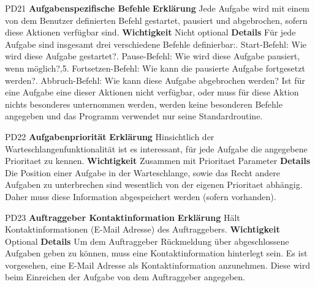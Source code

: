 \documentclass[a4paper,12pt]{article}
\begin{document}
\begin{itemize}[nosep]
\begin{minipage}[t]{\linewidth}
\item[PD21] \textbf{Aufgabenspezifische Befehle}
\subitem \textbf{Erklärung} Jede Aufgabe wird mit einem von dem Benutzer definierten Befehl gestartet, pausiert und abgebrochen, sofern diese Aktionen verfügbar sind.
\subitem \textbf{Wichtigkeit} Nicht optional
\subitem \textbf{Details} Für jede Aufgabe sind insgesamt drei verschiedene Befehle definierbar:. Start-Befehl: Wie wird diese Aufgabe gestartet?. Pause-Befehl: Wie wird diese Aufgabe pausiert, wenn möglich?,5. Fortsetzen-Befehl: Wie kann die pausierte Aufgabe fortgesetzt werden?. Abbruch-Befehl: Wie kann diese Aufgabe abgebrochen werden?\newline
Ist für eine Aufgabe eine dieser Aktionen nicht verfügbar, oder muss für diese Aktion nichts besonderes unternommen werden, werden keine besonderen Befehle angegeben und das Programm verwendet nur seine Standardroutine.
\end{minipage}
\pagebreak

\begin{minipage}[t]{\linewidth}
\item[PD22] \textbf{Aufgabenpriorität}
\subitem \textbf{Erklärung} Hinsichtlich der Warteschlangenfunktionalität ist es interessant, für jede Aufgabe die angegebene \gls{Prioritaet} zu kennen.
\subitem \textbf{Wichtigkeit} Zusammen mit \gls{Prioritaet} Parameter
\subitem \textbf{Details} Die Position einer Aufgabe in der Warteschlange, sowie das Recht andere Aufgaben zu unterbrechen sind wesentlich von der eigenen \gls{Prioritaet} abhängig. Daher muss diese Information abgespeichert werden (sofern vorhanden).
\end{minipage}
\pagebreak

\begin{minipage}[t]{\linewidth}
\item[PD23] \textbf{Auftraggeber Kontaktinformation}
\subitem \textbf{Erklärung} Hält Kontaktinformationen (E-Mail Adresse) des Auftraggebers.
\subitem \textbf{Wichtigkeit} Optional
\subitem \textbf{Details} Um dem Auftraggeber Rückmeldung über abgeschlossene Aufgaben geben zu können, muss eine Kontaktinformation hinterlegt sein.\newline
Es ist vorgesehen, eine E-Mail Adresse als Kontaktinformation anzunehmen. Diese wird beim Einreichen der Aufgabe von dem Auftraggeber angegeben.
\end{minipage}
\pagebreak


\end{itemize}
\end{document}
